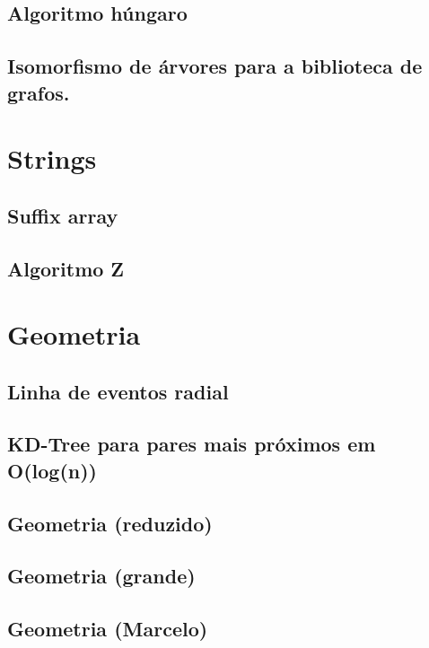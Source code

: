 \subsection{Algoritmo húngaro}
\raggedbottom
\hrulefill
\subsection{Isomorfismo de árvores para a biblioteca de grafos.}
\raggedbottom
\hrulefill
\clearpage
\section{Strings}
\subsection{Suffix array}
\raggedbottom
\hrulefill
\subsection{Algoritmo Z}
\raggedbottom
\hrulefill
\clearpage
\section{Geometria}
\subsection{Linha de eventos radial}
\raggedbottom
\hrulefill
\subsection{KD-Tree para pares mais próximos em O(log(n))}
\raggedbottom
\hrulefill
\subsection{Geometria (reduzido)}
\raggedbottom
\hrulefill
\subsection{Geometria (grande)}
\raggedbottom
\hrulefill
\subsection{Geometria (Marcelo)}
\raggedbottom
\hrulefill
\clearpage

